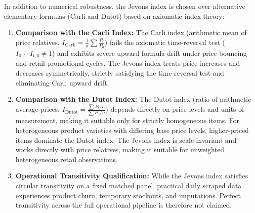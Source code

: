 \hs In addition to numerical robustness, the Jevons index is chosen over alternative elementary formulas (Carli and Dutot) based on axiomatic index theory:
\begin{enumerate}
    \item \textbf{Comparison with the Carli Index:} The Carli index (arithmetic mean of price relatives, $I_{\text{Carli}} = \frac{1}{n}\sum \frac{P_t}{P_0}$) fails the axiomatic time-reversal test ($I_{0,t} \cdot I_{t,0} \neq 1$) and exhibits severe upward formula drift under price bouncing and retail promotional cycles. The Jevons index treats price increases and decreases symmetrically, strictly satisfying the time-reversal test and eliminating Carli upward drift.
    \item \textbf{Comparison with the Dutot Index:} The Dutot index (ratio of arithmetic average prices, $I_{\text{Dutot}} = \frac{\sum P_t / n}{\sum P_0 / n}$) depends directly on price levels and units of measurement, making it suitable only for strictly homogeneous items. For heterogeneous product varieties with differing base price levels, higher-priced items dominate the Dutot index. The Jevons index is scale-invariant and works directly with price relatives, making it suitable for unweighted heterogeneous retail observations.
    \item \textbf{Operational Transitivity Qualification:} While the Jevons index satisfies circular transitivity on a fixed matched panel, practical daily scraped data experiences product churn, temporary stockouts, and imputations. Perfect transitivity across the full operational pipeline is therefore not claimed.
\end{enumerate}

